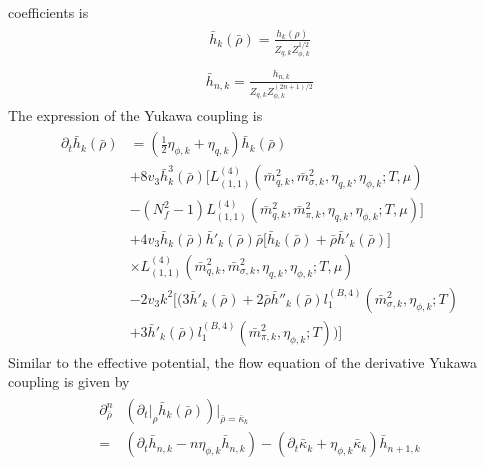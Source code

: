 \documentclass[%
reprint,
superscriptaddress,
showpacs,preprintnumbers,
 amsmath,amssymb,
 aps,
prd,
]{revtex4-1}
\begin{document}
coefficients is
\begin{align}\label{}
\begin{split}
\bar{h}_k(\bar{\rho})=\frac{h_k(\rho)}{Z_{q,k}Z^{1/2}_{\phi,k}}
\end{split}
\end{align}
\begin{align}\label{}
\begin{split}
\bar{h}_{n,k}=\frac{h_{n,k}}{Z_{q,k}Z^{(2n+1)/2}_{\phi,k}}
\end{split}
\end{align}
The expression of the Yukawa coupling is
\begin{align}
\begin{split}
\partial_t\bar{h}_k(\bar{\rho})&=(\frac{1}{2}\eta_{\phi,k}+\eta_{q,k})\bar{h}_k(\bar{\rho})\\
&+8v_3\bar{h}^3_k(\bar{\rho})\bigg[L^{(4)}_{(1,1)}(\bar{m}^{2}_{q,k},\bar{m}^{2}_{\sigma,k},\eta_{q,k},\eta_{\phi,k};T,\mu)\\
&-(N^{2}_{f}-1)L^{(4)}_{(1,1)}(\bar{m}^{2}_{q,k},\bar{m}^{2}_{\pi,k},\eta_{q,k},\eta_{\phi,k};T,\mu)\bigg]\\
&+4v_3\bar{h}_k(\bar{\rho})\bar{h}'_k(\bar{\rho})\bar{\rho}\bigg[\bar{h}_k(\bar{\rho})+\bar{\rho}\bar{h}'_k(\bar{\rho})\bigg]\\
&\times L^{(4)}_{(1,1)}(\bar{m}^{2}_{q,k},\bar{m}^{2}_{\sigma,k},\eta_{q,k},\eta_{\phi,k};T,\mu)\\
&-2v_3k^2\bigg[(3\bar{h}'_k(\bar{\rho})+2\bar{\rho}\bar{h}''_k(\bar{\rho})l^{(B,4)}_{1}(\bar{m}^{2}_{\sigma,k},\eta_{\phi,k};T)\\
&+3\bar{h}'_k(\bar{\rho})l^{(B,4)}_{1}(\bar{m}^{2}_{\pi,k},\eta_{\phi,k};T))\bigg]
\end{split}
\end{align} 
Similar to the effective potential, the flow equation of the derivative Yukawa coupling is given by
\begin{align}\label{}
\begin{split}
\partial^{n}_{\bar{\rho}}&(\partial_t\big|_{\rho}\bar{h}_k(\bar{\rho}))\bigg|_{\bar{\rho}=\bar{\kappa}_k} \\
=&(\partial_t\bar{h}_{n,k}-n\eta_{\phi,k}\bar{h}_{n,k})-(\partial_t\bar{\kappa}_k+\eta_{\phi,k}\bar{\kappa}_k)\bar{h}_{n+1,k}
\end{split}
\end{align} 
\end{document}
